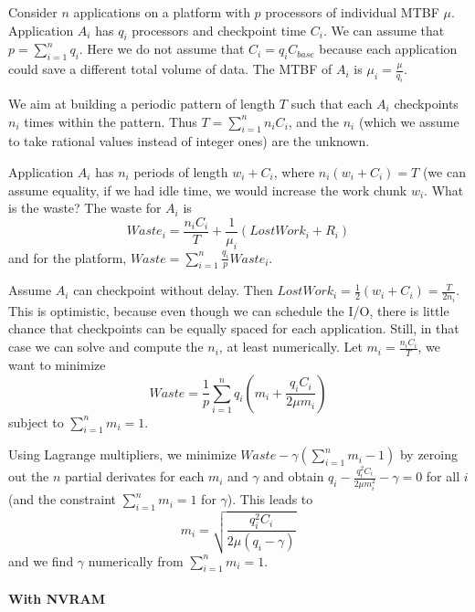 \documentclass{article}
\begin{document}
Consider $n$ applications on a platform with $p$ processors of individual MTBF $\mu$.
 Application $A_{i}$ has $q_{i}$ processors and checkpoint time $C_{i}$. We can
 assume that $p = \sum_{i=1}^{n} q_{i}$.
Here we do not assume that $C_{i} = q_{i} C_{\textit{base}}$ because each application could save a different total volume of data. The MTBF of $A_{i}$ is $\mu_{i} = \frac{\mu}{q_{i}}$.

We aim at building a periodic pattern of length $T$ such that each $A_{i}$ checkpoints $n_{i}$ times
within the pattern. Thus $T  = \sum_{i=1}^{n} n_{i} C_{i}$, and the $n_{i}$ (which we assume
to take rational values instead of integer ones) are the unknown. 

Application $A_{i}$ has $n_{i}$ periods of length $w_{i}+C_{i}$, where $n_{i} (w_{i}+C_{i})=T$
(we can assume equality, if we had idle time, we would increase the work chunk $w_{i}$.
What is the waste? The waste for $A_{i}$ is 
$$Waste_{i} = \frac{n_{i} C_{i}}{T} + \frac{1}{\mu_{i}} (LostWork_{i} + R_{i})$$
and for the platform, $Waste = \sum_{i=1}^{n} \frac{q_{i}}{p} Waste_{i}$.


Assume $A_{i}$ can checkpoint without delay. Then $LostWork_{i} = \frac{1}{2} (w_{i}+C_{i}) = \frac{T}{2n_{i}}$.
This is  optimistic, because even though we can schedule the I/O, there is little chance that checkpoints can be equally spaced for each application.
Still, in that case we can solve and compute the $n_{i}$, at least numerically. Let $m_{i} =  \frac{n_{i} C_{i}}{T}$, we want to minimize 
$$Waste = \frac{1}{p} \sum_{i=1}^{n} q_{i} (m_{i} +  \frac{q_{i} C_{i}}{2 \mu m_{i}})$$ 
subject to $\sum_{i=1}^{n} m_{i} = 1$.

Using Lagrange multipliers, we minimize $Waste - \gamma (\sum_{i=1}^{n} m_{i} - 1)$
by zeroing out the $n$ partial derivates for each $m_{i}$ and $\gamma$ and obtain
$q_{i} - \frac{q_{i}^{2} C_{i}}{2 \mu m_{i}^{2}} - \gamma = 0$ for all $i$ (and the constraint
$\sum_{i=1}^{n} m_{i} = 1$ for $\gamma$). This leads to 
$$m_{i} = \sqrt{\frac{q_{i}^{2} C_{i}}{2 \mu (q_{i} - \gamma)}}$$
and we find $\gamma$ numerically from $\sum_{i=1}^{n} m_{i} = 1$.

\paragraph{With NVRAM}
\end{document}
